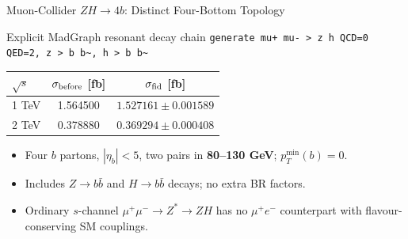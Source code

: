 \documentclass[aspectratio=1610,english]{beamer}
\newcommand{\src}[1]{\vfill{\par\color{black!65}\fontsize{6.4}{7.4}\selectfont\emph{Source:} #1\par}}
\begin{document}
\begin{frame}[t]{Muon-Collider $ZH\to4b$: Distinct Four-Bottom Topology}
\small

\begin{block}{Explicit MadGraph resonant decay chain}
\texttt{generate mu+ mu- > z h QCD=0 QED=2, z > b b\textasciitilde{}, h > b b\textasciitilde{}}
\end{block}
\begin{center}\begin{tabular}{lcc}\toprule
$\sqrt{s}$ & $\sigma_{\rm before}$ [fb] & $\sigma_{\rm fid}$ [fb]\\\midrule
1 TeV & 1.564500 & $1.527161\pm0.001589$\\
2 TeV & 0.378880 & $0.369294\pm0.000408$\\\bottomrule
\end{tabular}\end{center}
\begin{itemize}
\item Four $b$ partons, $|\eta_b|<5$, two pairs in \textbf{80--130 GeV}; $p_T^{\min}(b)=0$.
\item Includes $Z\to b\bar b$ and $H\to b\bar b$ decays; no extra BR factors.
\item Ordinary $s$-channel $\mu^+\mu^-\to Z^*\to ZH$ has no $\mu^+e^-$ counterpart with flavour-conserving SM couplings.
\end{itemize}

\end{frame}
\end{document}
